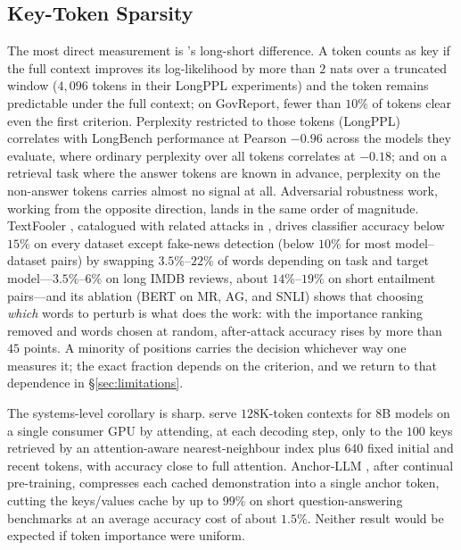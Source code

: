 \subsection{Key-Token Sparsity}

The most direct measurement is \citet{fang2024what}'s long-short difference. A token counts as key if the full context improves its log-likelihood by more than $2$ nats over a truncated window ($4{,}096$ tokens in their LongPPL experiments) and the token remains predictable under the full context; on GovReport, fewer than $10\%$ of tokens clear even the first criterion. Perplexity restricted to those tokens (LongPPL) correlates with LongBench performance at Pearson $-0.96$ across the models they evaluate, where ordinary perplexity over all tokens correlates at $-0.18$; and on a retrieval task where the answer tokens are known in advance, perplexity on the non-answer tokens carries almost no signal at all. Adversarial robustness work, working from the opposite direction, lands in the same order of magnitude. TextFooler \citep{jin2020textfooler}, catalogued with related attacks in \citet{morris2022textattack}, drives classifier accuracy below $15\%$ on every dataset except fake-news detection (below $10\%$ for most model--dataset pairs) by swapping $3.5\%$--$22\%$ of words depending on task and target model---$3.5\%$--$6\%$ on long IMDB reviews, about $14\%$--$19\%$ on short entailment pairs---and its ablation (BERT on MR, AG, and SNLI) shows that choosing \emph{which} words to perturb is what does the work: with the importance ranking removed and words chosen at random, after-attack accuracy rises by more than $45$ points. A minority of positions carries the decision whichever way one measures it; the exact fraction depends on the criterion, and we return to that dependence in \S\ref{sec:limitations}.

The systems-level corollary is sharp. \citet{liu2024retrieval} serve $128$K-token contexts for 8B models on a single consumer GPU by attending, at each decoding step, only to the $100$ keys retrieved by an attention-aware nearest-neighbour index plus $640$ fixed initial and recent tokens, with accuracy close to full attention. Anchor-LLM \citep{pang2024anchor}, after continual pre-training, compresses each cached demonstration into a single anchor token, cutting the keys/values cache by up to $99\%$ on short question-answering benchmarks at an average accuracy cost of about $1.5\%$. Neither result would be expected if token importance were uniform.


